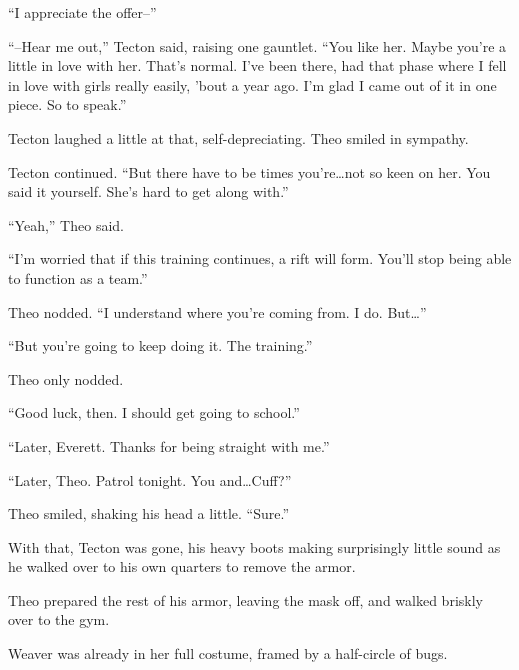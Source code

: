 ``I appreciate the offer--''



``--Hear me out,'' Tecton said, raising one gauntlet.  ``You like her.  Maybe you're a little in love with her.  That's normal.  I've been there, had that phase where I fell in love with girls really easily, 'bout a year ago.  I'm glad I came out of it in one piece.  So to speak.''



Tecton laughed a little at that, self-depreciating.  Theo smiled in sympathy.



Tecton continued.  ``But there have to be times you're\ldots not so keen on her.  You said it yourself.  She's hard to get along with.''



``Yeah,'' Theo said.



``I'm worried that if this training continues, a rift will form.  You'll stop being able to function as a team.''



Theo nodded.  ``I understand where you're coming from.  I do.  But\ldots''



``But you're going to keep doing it.  The training.''



Theo only nodded.



``Good luck, then.  I should get going to school.''



``Later, Everett.  Thanks for being straight with me.''



``Later, Theo.  Patrol tonight.  You and\ldots Cuff?''



Theo smiled, shaking his head a little.  ``Sure.''



With that, Tecton was gone, his heavy boots making surprisingly little sound as he walked over to his own quarters to remove the armor.



Theo prepared the rest of his armor, leaving the mask off, and walked briskly over to the gym.



Weaver was already in her full costume, framed by a half-circle of bugs.



